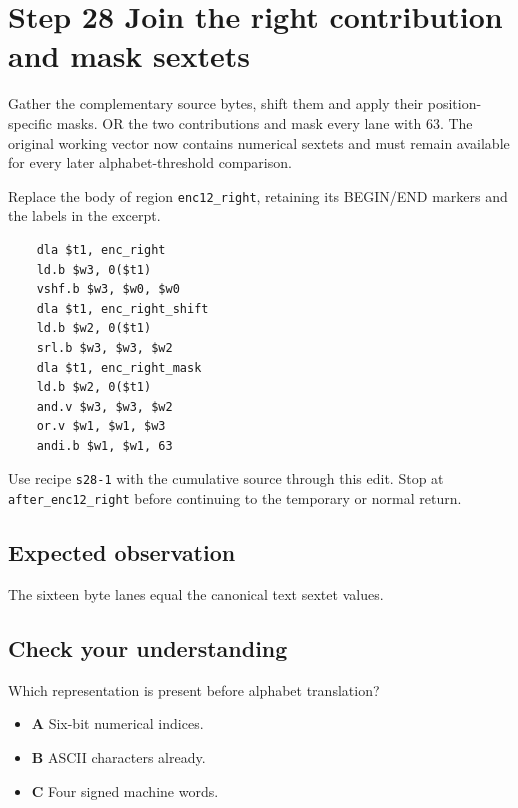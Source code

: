 \section{Step 28 Join the right contribution and mask sextets}\label{base64-s28}

Gather the complementary source bytes, shift them and apply their position-specific masks. OR the two contributions and mask every lane with 63. The original working vector now contains numerical sextets and must remain available for every later alphabet-threshold comparison.

Replace the body of region \texttt{enc12\_right}, retaining its BEGIN/END markers and the labels in the excerpt.

\begin{verbatim}
    dla $t1, enc_right
    ld.b $w3, 0($t1)
    vshf.b $w3, $w0, $w0
    dla $t1, enc_right_shift
    ld.b $w2, 0($t1)
    srl.b $w3, $w3, $w2
    dla $t1, enc_right_mask
    ld.b $w2, 0($t1)
    and.v $w3, $w3, $w2
    or.v $w1, $w1, $w3
    andi.b $w1, $w1, 63
\end{verbatim}

Use recipe \texttt{s28-1} with the cumulative source through this edit. Stop at \texttt{after\_enc12\_right} before continuing to the temporary or normal return.

\subsection{Expected observation}
The sixteen byte lanes equal the canonical text sextet values.

\subsection{Check your understanding}
Which representation is present before alphabet translation?

\begin{itemize}
\item \textbf{A} Six-bit numerical indices.
\item \textbf{B} ASCII characters already.
\item \textbf{C} Four signed machine words.
\end{itemize}
